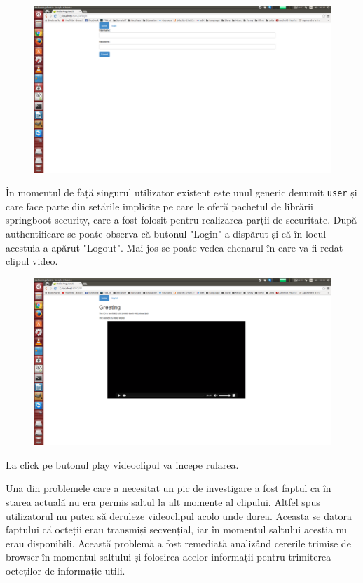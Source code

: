 \documentclass[12pt, a4paper, oneside, romanian]{teza-upb}
\begin{document}
\begin{figure}[h]
\centering
\includegraphics*[scale=0.2]{img/poza2.png}
\end{figure}

În momentul de față singurul utilizator existent este unul generic denumit \texttt{user} și care face parte din setările implicite pe care le oferă pachetul de librării springboot-security, care a fost folosit pentru realizarea parții de securitate.
\newpage
După authentificare se poate observa că butonul "Login" a dispărut și că în locul acestuia a apărut "Logout". Mai jos se poate vedea chenarul în care va fi redat clipul video.

\begin{figure}[h]
\centering
\includegraphics*[scale=0.2]{img/poza3.png}
\end{figure}

La click pe butonul play videoclipul va incepe rularea. 

Una din problemele care a necesitat un pic de investigare a fost faptul ca în starea actuală nu era permis saltul la alt momente al clipului. Altfel spus utilizatorul nu putea să deruleze videoclipul acolo unde dorea. Aceasta se datora faptului că octeții erau transmiși secvențial, iar în momentul saltului acestia nu erau disponibili. Această problemă a fost remediată analizând cererile trimise de browser în momentul saltului și folosirea acelor informații pentru trimiterea octeților de informație utili.
\end{document}
